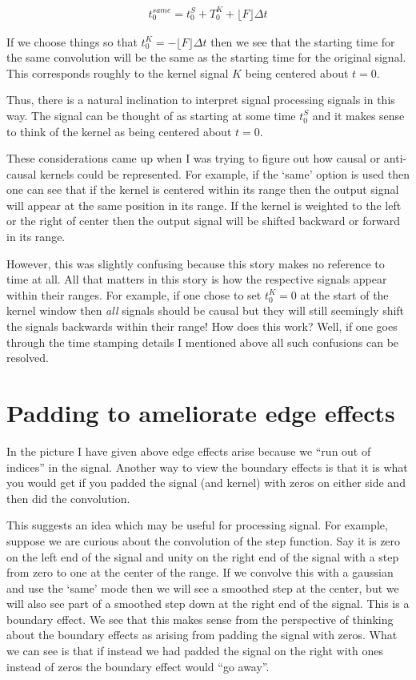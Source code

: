 \documentclass[12pt]{article}
\begin{document}
\begin{align}
t_0^{same} = t_0^S + T_0^K + \lfloor F \rfloor\Delta t
\end{align}

If we choose things so that $t_0^K = -\lfloor F \rfloor\Delta t$ then we see that the starting time for the same convolution will be the same as the starting time for the original signal. This corresponds roughly to the kernel signal $K$ being centered about $t=0$.

Thus, there is a natural inclination to interpret signal processing signals in this way. The signal can be thought of as starting at some time $t_0^S$ and it makes sense to think of the kernel as being centered about $t=0$. 

These considerations came up when I was trying to figure out how causal or anti-causal kernels could be represented. For example, if the `same' option is used then one can see that if the kernel is centered within its range then the output signal will appear at the same position in its range. If the kernel is weighted to the left or the right of center then the output signal will be shifted backward or forward in its range. 

However, this was slightly confusing because this story makes no reference to time at all. All that matters in this story is how the respective signals appear within their ranges. For example, if one chose to set $t_0^K=0$ at the start of the kernel window then \textit{all} signals should be causal but they will still seemingly shift the signals backwards within their range! How does this work? Well, if one goes through the time stamping details I mentioned above all such confusions can be resolved.

\section{Padding to ameliorate edge effects}

In the picture I have given above edge effects arise because we ``run out of indices'' in the signal. Another way to view the boundary effects is that it is what you would get if you padded the signal (and kernel) with zeros on either side and then did the convolution. 

This suggests an idea which may be useful for processing signal. For example, suppose we are curious about the convolution of the step function. Say it is zero on the left end of the signal and unity on the right end of the signal with a step from zero to one at the center of the range. If we convolve this with a gaussian and use the `same' mode then we will see  a smoothed step at the center, but we will also see part of a smoothed step down at the right end of the signal. This is a boundary effect. We see that this makes sense from the perspective of thinking about the boundary effects as arising from padding the signal with zeros. What we can see is that if instead we had padded the signal on the right with ones instead of zeros the boundary effect would ``go away''.
\end{document}
